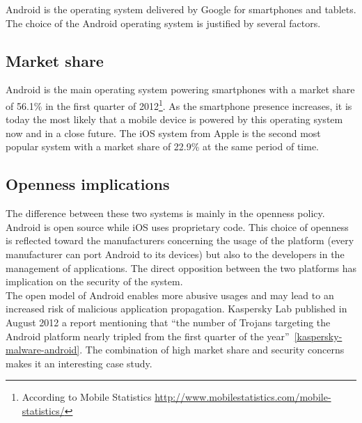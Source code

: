 Android is the operating system delivered by Google for smartphones and tablets.
The choice of the Android operating system is justified by several factors.\\

\subsection*{Market share}

Android is the main operating system powering smartphones with a market share of 56.1\% in the first quarter of 2012\footnote{According to Mobile Statistics \url{http://www.mobilestatistics.com/mobile-statistics/}}.
As the smartphone presence increases, it is today the most likely that a mobile device is powered by this operating system now and in a close future.
The iOS system from Apple is the second most popular system with a market share of 22.9\% at the same period of time.\\

\subsection*{Openness implications}
The difference between these two systems is mainly in the openness policy.
Android is open source while iOS uses proprietary code.
This choice of openness is reflected toward the manufacturers concerning the usage of the platform (every manufacturer can port Android to its devices) but also to the developers in the management of applications.
The direct opposition between the two platforms has implication on the security of the system.\\

The open model of Android enables more abusive usages and may lead to an increased risk of malicious application propagation.
Kaspersky Lab published in August 2012 a report mentioning that ``the number of Trojans targeting the Android platform nearly tripled from the first quarter of the year''~\ref{kaspersky-malware-android}.
The combination of high market share and security concerns makes it an interesting case study.\\

